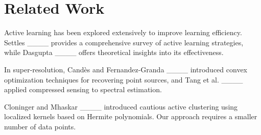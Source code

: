 \section{Related Work}
Active learning has been explored extensively to improve learning efficiency. Settles ____ provides a comprehensive survey of active learning strategies, while Dasgupta ____ offers theoretical insights into its effectiveness.

In super-resolution, Candès and Fernandez-Granda ____ introduced convex optimization techniques for recovering point sources, and Tang et al. ____ applied compressed sensing to spectral estimation.


Cloninger and Mhaskar ____ introduced cautious active clustering using localized kernels based on Hermite polynomials.
Our approach requires a smaller number of data points.